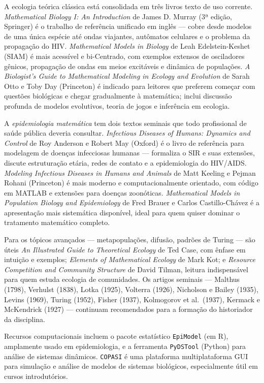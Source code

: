 {
A ecologia teórica clássica está consolidada em três livros texto de uso
corrente. \textit{Mathematical Biology I: An Introduction} de James D. Murray
(3ª edição, Springer) é o trabalho de referência unificado em inglês --- cobre
desde modelos de uma única espécie até ondas viajantes, autômatos celulares e
o problema da propagação do HIV. \textit{Mathematical Models in Biology} de Leah
Edelstein-Keshet (SIAM) é mais acessível e bi-Centrado, com exemplos extensos
de osciladores gênicos, propagação de ondas em meios excitáveis e dinâmica
de populações. \textit{A Biologist's Guide to Mathematical Modeling in Ecology
and Evolution} de Sarah Otto e Toby Day (Princeton) é indicado para leitores
que preferem começar com questões biológicas e chegar gradualmente à matemática;
inclui discussão profunda de modelos evolutivos, teoria de jogos e inferência
em ecologia.

A \emph{epidemiologia matemática} tem dois textos seminais que todo profissional
de saúde pública deveria consultar. \textit{Infectious Diseases of Humans:
Dynamics and Control} de Roy Anderson e Robert May (Oxford) é o livro de
referência para modelagem de doenças infecciosas humanas --- formaliza o SIR
e suas extensões, discute estruturação etária, redes de contato e a
epidemiologia do HIV/AIDS. \textit{Modeling Infectious Diseases in Humans
and Animals} de Matt Keeling e Pejman Rohani (Princeton) é mais moderno e
computacionalmente orientado, com código em MATLAB e extensões para doenças
zoonóticas. \textit{Mathematical Models in Population Biology and
Epidemiology} de Fred Brauer e Carlos Castillo-Chávez é a apresentação mais
sistemática disponível, ideal para quem quiser dominar o tratamento
matemático completo.

Para os tópicos avançados --- metapopulações, difusão, padrões de Turing ---
são úteis \textit{An Illustrated Guide to Theoretical Ecology} de Ted Case, com
ênfase em intuição e exemplos; \textit{Elements of Mathematical Ecology} de
Mark Kot; e \textit{Resource Competition and Community Structure} de David
Tilman, leitura indispensável para quem estuda ecologia de comunidades. Os
artigos seminais --- Malthus (1798), Verhulst (1838), Lotka (1925),
Volterra (1926), Nicholson e Bailey (1935), Levins (1969), Turing (1952),
Fisher (1937), Kolmogorov et al.\ (1937), Kermack e McKendrick (1927) ---
continuam recomendados para a formação do historiador da disciplina.

Recursos computacionais incluem o pacote estatístico \texttt{EpiModel} (em R),
amplamente usado em epidemiologia, e a ferramenta \texttt{PyDSTool} (Python)
para análise de sistemas dinâmicos. \texttt{COPASI} é uma plataforma
multiplataforma GUI para simulação e análise de modelos de sistemas
biológicos, especialmente útil em cursos introdutórios.

}

